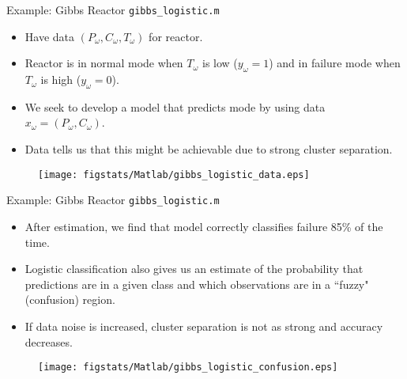 \documentclass[handout,9pt]{beamer}
\begin{document}
%
\begin{frame}{Example: Gibbs Reactor \footnotesize{\texttt{gibbs\_logistic.m}}}

\begin{itemize}
  \setlength{\itemsep}{10pt}
\item Have data $(P_\omega,C_\omega,T_\omega)$ for reactor.
\item Reactor is in normal mode when $T_\omega$ is low ($y_\omega=1$) and in failure mode when $T_\omega$ is high ($y_\omega=0$).
\item We seek to develop a model that predicts mode by using data $x_\omega=(P_\omega,C_\omega)$. 
\item Data tells us that this might be achievable due to strong cluster separation.
\end{itemize}

\begin{figure}[!htb]
    \centering
	\texttt{[image: figstats/Matlab/gibbs\_logistic\_data.eps]}
\end{figure}

\end{frame}

%
\begin{frame}{Example: Gibbs Reactor \footnotesize{\texttt{gibbs\_logistic.m}}}

\begin{itemize}
  \setlength{\itemsep}{10pt}
\item After estimation, we find that model correctly classifies failure 85\% of the time. 
\item Logistic classification also gives us an estimate of the probability that predictions are in a given class and which observations are in a ``fuzzy" (confusion) region. 
\item If data noise is increased, cluster separation is not as strong and accuracy decreases. 
\end{itemize}

\begin{figure}[!htb]
    \centering
	\texttt{[image: figstats/Matlab/gibbs\_logistic\_confusion.eps]}
\end{figure}



\end{frame}
\end{document}
